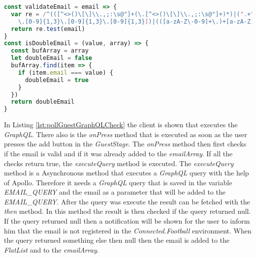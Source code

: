 \begin{lstlisting}[language=javascript, caption=Check E-Mail Methods, label=lst:pollGuestsCheck]
const validateEmail = email => {
  var re = /^(([^<>()\[\]\\.,;:\s@"]+(\.[^<>()\[\]\\.,;:\s@"]+)*)|(".+"))@((\[[0-9]{1,3}
    \.[0-9]{1,3}\.[0-9]{1,3}\.[0-9]{1,3}])|(([a-zA-Z\-0-9]+\.)+[a-zA-Z]{2,}))$/
  return re.test(email)
}
const isDoubleEmail = (value, array) => {
  const bufArray = array
  let doubleEmail = false
  bufArray.find(item => {
    if (item.email === value) {
      doubleEmail = true
    }
  })
  return doubleEmail
}
\end{lstlisting}

In Listing \ref{lst:pollGuestGraphQLCheck} the client is shown that executes the \textit{GraphQL}. There also is the \textit{onPress} method that is executed as soon as the user presses the add button in the \textit{GuestStage}. The \textit{onPress} method then first checks if the email is valid and if it was already added to the \textit{emailArray}. If all the checks return true, the \textit{executeQuery} method is executed. 
\newline
The \textit{executeQuery} method is a Asynchronous method that executes a \textit{GraphQL} query with the help of Apollo. Therefore it needs a \textit{GraphQL} query that is saved in the variable \textit{EMAIL\_QUERY} and the email as a parameter that will be added to the \textit{EMAIL\_QUERY}. After the query was execute the result can be fetched with the \textit{then} method. In this method the result is then checked if the query returned null. If the query returned null then a notification will be shown for the user to inform him that the email is not registered in the \textit{Connected.Football} environment. When the query returned something else then null then the email is added to the \textit{FlatList} and to the \textit{emailArray}.
